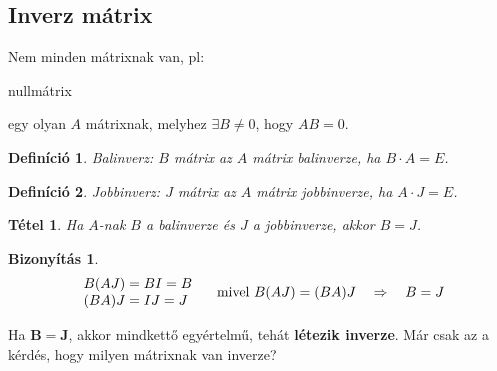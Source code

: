 \documentclass[a4paper,12pt,twoside]{book}
\newtheorem{defi}{Definíció}[chapter]
\newtheorem{tetel}{Tétel}[chapter]
\newtheorem{biz}{Bizonyítás}[chapter]
\theoremstyle{break}
\begin{document}
\subsection{Inverz mátrix}

Nem minden mátrixnak van, pl:
\begin{itemize*}
 \item nullmátrix
 \item egy olyan $A$ mátrixnak, melyhez $\exists B\neq 0$, hogy $AB = 0$.
\end{itemize*}

\begin{defi}
 \emph{Balinverz}: $B$ mátrix az $A$ mátrix balinverze, ha $B\cdot A = E$.
\end{defi}

\begin{defi}
 \emph{Jobbinverz}: $J$ mátrix az $A$ mátrix jobbinverze, ha $A\cdot J = E$.
\end{defi}

\begin{tetel}
 Ha $A$-nak $B$ a balinverze és $J$ a jobbinverze, akkor $B=J$.
\end{tetel}
\begin{biz}
 \[\left.\begin{array}{l}
    B(AJ) = BI = B\\
    (BA)J = IJ = J
   \end{array}\right. \quad \hbox{mivel } B(AJ)=(BA)J \quad \Rightarrow \quad B=J
 \]
\end{biz}

Ha $\mathbf{B=J}$, akkor mindkettő egyértelmű, tehát \textbf{létezik inverze}. Már csak az a kérdés, hogy milyen mátrixnak van inverze?
\end{document}
